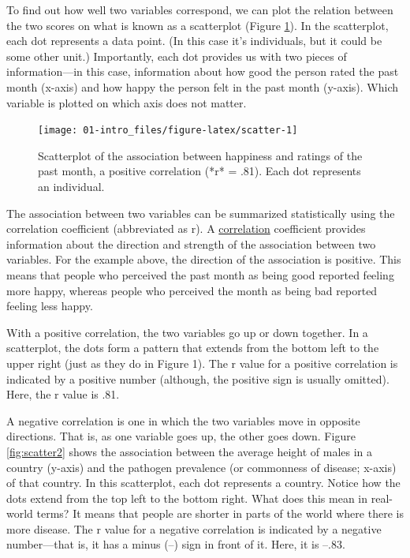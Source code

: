 \documentclass[
]{krantz}
\begin{document}
To find out how well two variables correspond, we can plot the relation between the two scores on what is known as a scatterplot (Figure \ref{fig:scatter}). In the scatterplot, each dot represents a data point. (In this case it's individuals, but it could be some other unit.) Importantly, each dot provides us with two pieces of information---in this case, information about how good the person rated the past month (x-axis) and how happy the person felt in the past month (y-axis). Which variable is plotted on which axis does not matter.

\begin{figure}

{\centering \texttt{[image: 01-intro\_files/figure-latex/scatter-1]} 

}

\caption{Scatterplot of the association between happiness and ratings of the past month, a positive correlation (*r* = .81). Each dot represents an individual.}\label{fig:scatter}
\end{figure}

The association between two variables can be summarized statistically using the correlation coefficient (abbreviated as r). A \protect\hyperlink{correlation}{correlation} coefficient provides information about the direction and strength of the association between two variables. For the example above, the direction of the association is positive. This means that people who perceived the past month as being good reported feeling more happy, whereas people who perceived the month as being bad reported feeling less happy.

With a positive correlation, the two variables go up or down together. In a scatterplot, the dots form a pattern that extends from the bottom left to the upper right (just as they do in Figure 1). The r value for a positive correlation is indicated by a positive number (although, the positive sign is usually omitted). Here, the r value is .81.

A negative correlation is one in which the two variables move in opposite directions. That is, as one variable goes up, the other goes down. Figure \ref{fig:scatter2} shows the association between the average height of males in a country (y-axis) and the pathogen prevalence (or commonness of disease; x-axis) of that country. In this scatterplot, each dot represents a country. Notice how the dots extend from the top left to the bottom right. What does this mean in real-world terms? It means that people are shorter in parts of the world where there is more disease. The r value for a negative correlation is indicated by a negative number---that is, it has a minus (--) sign in front of it. Here, it is --.83.
\end{document}
